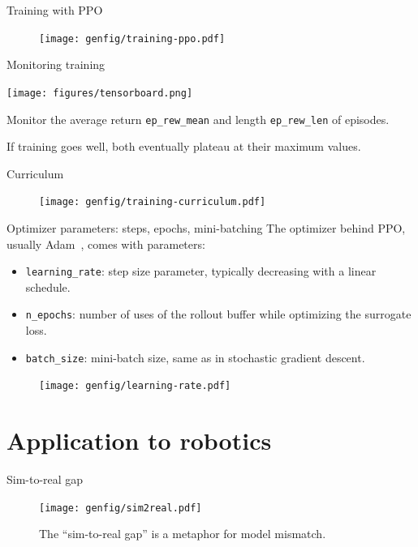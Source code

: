 \documentclass[10pt, aspectratio=1610]{beamer}
\begin{document}
\begin{frame}{Training with PPO}
    \begin{figure}
        \texttt{[image: genfig/training-ppo.pdf]}
    \end{figure}
\end{frame}

\begin{frame}{Monitoring training}
   \begin{adjustbox}{height=17em, keepaspectratio, center}
       \texttt{[image: figures/tensorboard.png]}
   \end{adjustbox}

    Monitor the average return \texttt{ep_rew_mean} and length \texttt{ep_rew_len} of episodes.

    If training goes well, both eventually plateau at their maximum values.
\end{frame}

\begin{frame}{Curriculum}
    \begin{figure}
        \texttt{[image: genfig/training-curriculum.pdf]}
    \end{figure}
\end{frame}

\begin{frame}{Optimizer parameters: steps, epochs, mini-batching}
    The optimizer behind PPO, usually Adam~\cite{kingma2014adam}, comes with parameters:
    \begin{itemize}
        \item \texttt{learning_rate}: step size parameter, typically decreasing with a linear schedule.
        \item \texttt{n_epochs}: number of uses of the rollout buffer while optimizing the surrogate loss.
        \item \texttt{batch_size}: mini-batch size, same as in stochastic gradient descent.
    \end{itemize}
    \begin{figure}
        \texttt{[image: genfig/learning-rate.pdf]}
    \end{figure}
\end{frame}

\section{Application to robotics}

\begin{frame}{Sim-to-real gap}
    \begin{figure}
        \texttt{[image: genfig/sim2real.pdf]}
        \caption{The ``sim-to-real gap'' is a metaphor for model mismatch.}
    \end{figure}
\end{frame}
\end{document}
